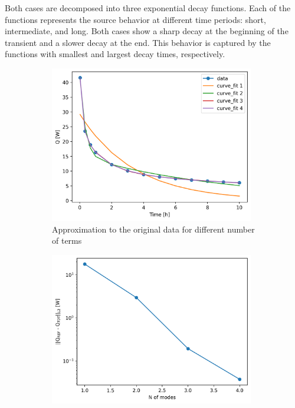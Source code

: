 Both cases are decomposed into three exponential decay functions.
Each of the functions represents the source behavior at different time periods: short, intermediate, and long.
Both cases show a sharp decay at the beginning of the transient and a slower decay at the end.
This behavior is captured by the functions with smallest and largest decay times, respectively.

\begin{figure}[htbp!] %
  \centering
  \begin{subfigure}[b]{0.48\textwidth}
    \centering
    \includegraphics[width=0.98\textwidth]{figures/demo-ft}
    \caption{Approximation to the original data for different number of terms}
    \label{fig:modes-demo-a}
  \end{subfigure}
  \hfill
  \begin{subfigure}[b]{0.48\textwidth}
    \centering
    \includegraphics[width=0.98\textwidth]{figures/demo-er}

\end{subfigure}
\end{figure}
